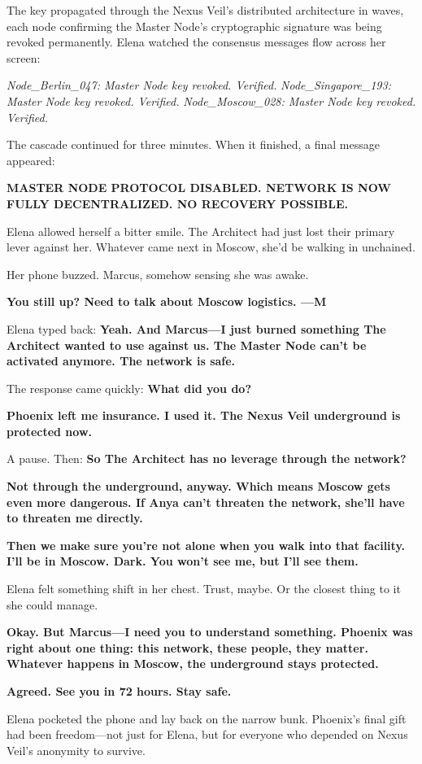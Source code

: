 The key propagated through the Nexus Veil's distributed architecture in waves, each node confirming the Master Node's cryptographic signature was being revoked permanently. Elena watched the consensus messages flow across her screen:

\emph{Node\_Berlin\_047: Master Node key revoked. Verified.} \emph{Node\_Singapore\_193: Master Node key revoked. Verified.} \emph{Node\_Moscow\_028: Master Node key revoked. Verified.}

The cascade continued for three minutes. When it finished, a final message appeared:

\textbf{MASTER NODE PROTOCOL DISABLED. NETWORK IS NOW FULLY DECENTRALIZED. NO RECOVERY POSSIBLE.}

Elena allowed herself a bitter smile. The Architect had just lost their primary lever against her. Whatever came next in Moscow, she'd be walking in unchained.

Her phone buzzed. Marcus, somehow sensing she was awake.

\textbf{You still up? Need to talk about Moscow logistics. ---M}

Elena typed back: \textbf{Yeah. And Marcus---I just burned something The Architect wanted to use against us. The Master Node can't be activated anymore. The network is safe.}

The response came quickly: \textbf{What did you do?}

\textbf{Phoenix left me insurance. I used it. The Nexus Veil underground is protected now.}

A pause. Then: \textbf{So The Architect has no leverage through the network?}

\textbf{Not through the underground, anyway. Which means Moscow gets even more dangerous. If Anya can't threaten the network, she'll have to threaten me directly.}

\textbf{Then we make sure you're not alone when you walk into that facility. I'll be in Moscow. Dark. You won't see me, but I'll see them.}

Elena felt something shift in her chest. Trust, maybe. Or the closest thing to it she could manage.

\textbf{Okay. But Marcus---I need you to understand something. Phoenix was right about one thing: this network, these people, they matter. Whatever happens in Moscow, the underground stays protected.}

\textbf{Agreed. See you in 72 hours. Stay safe.}

Elena pocketed the phone and lay back on the narrow bunk. Phoenix's final gift had been freedom---not just for Elena, but for everyone who depended on Nexus Veil's anonymity to survive.

